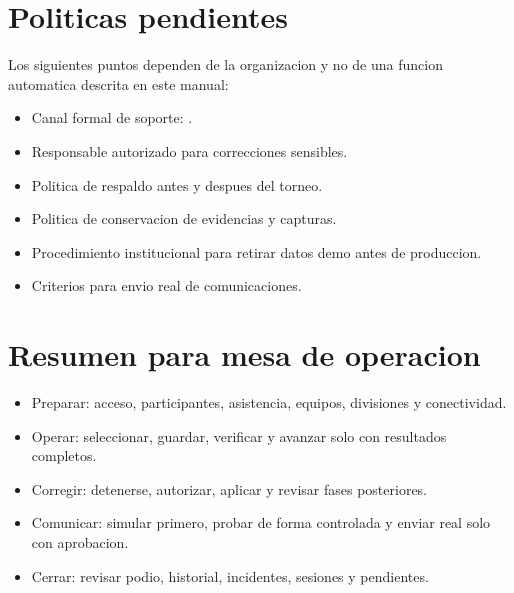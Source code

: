 \section{Politicas pendientes}

Los siguientes puntos dependen de la organizacion y no de una funcion automatica descrita en este manual:
\begin{itemize}
    \item Canal formal de soporte: .
    \item Responsable autorizado para correcciones sensibles.
    \item Politica de respaldo antes y despues del torneo.
    \item Politica de conservacion de evidencias y capturas.
    \item Procedimiento institucional para retirar datos demo antes de produccion.
    \item Criterios para envio real de comunicaciones.
\end{itemize}

\section{Resumen para mesa de operacion}

\begin{itemize}
    \item Preparar: acceso, participantes, asistencia, equipos, divisiones y conectividad.
    \item Operar: seleccionar, guardar, verificar y avanzar solo con resultados completos.
    \item Corregir: detenerse, autorizar, aplicar y revisar fases posteriores.
    \item Comunicar: simular primero, probar de forma controlada y enviar real solo con aprobacion.
    \item Cerrar: revisar podio, historial, incidentes, sesiones y pendientes.
\end{itemize}
